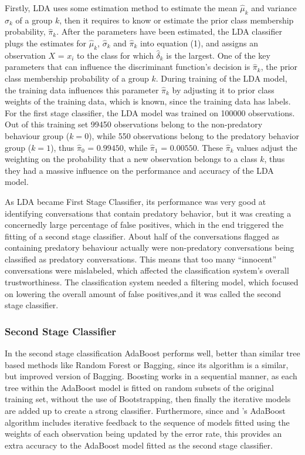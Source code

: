 \documentclass[11pt]{article}
\begin{document}
Firstly, LDA uses some estimation method to estimate the mean $\hat{\mu }_{k}$ and variance $\hat{\sigma}_{k}$ of a group $k$, then it requires to know or estimate the prior class membership probability, $\hat{\pi}_{k}$. After the parameters have been estimated, the LDA classifier plugs the estimates for $\hat{\mu }_{k}$, $\hat{\sigma}_{k}$ and $\hat{\pi}_{k}$ into equation (1), and assigns an observation $X$ = $x_i$ to the class for which $\hat{\delta}_{k}$ is the largest. One of the key parameters that can influence the discriminant function's decision is $\hat{\pi}_{k}$, the prior class membership probability of a group $k$. During training of the LDA model, the training data influences this parameter $\hat{\pi}_{k}$ by adjusting it to prior class weights of the training data, which is known, since the training data has labels. For the first stage classifier, the LDA model was trained on 100000 observations. Out of this training set 99450 observations belong to the non-predatory behaviour group ($k=0$), while 550 observations belong to the predatory behavior group ($k=1$), thus $\hat{\pi}_{0}$ = $0.99450$, while $\hat{\pi}_{1}$ = $0.00550$. These $\hat{\pi}_{k}$ values adjust the weighting on the probability that a new observation belongs to a class $k$, thus they had a massive influence on the performance and accuracy of the LDA model.

As LDA became First Stage Classifier, its performance was very good at identifying conversations that contain predatory behavior, but it was creating a concernedly large percentage of false positives, which in the end triggered the fitting of a second stage classifier. About half of the conversations flagged as containing predatory behaviour actually were non-predatory conversations being classified as predatory conversations. This means that too many ``innocent” conversations were mislabeled, which affected the classification system's overall trustworthiness. The classification system needed a filtering model, which focused on lowering the overall amount of false positives,and it was called the second stage classifier.

\subsubsection{Second Stage Classifier}
In the second stage classification AdaBoost performs well, better than similar tree based methods like Random Forest or Bagging, since its algorithm is a similar, but improved version of Bagging. Boosting works in a sequential manner, as each tree within the AdaBoost model is fitted on random subsets of the original training set, without the use of Bootstrapping, then finally the iterative models are added up to create a strong classifier. Furthermore, since \cite{freund1996experiments} and \cite{hastie2009multi}'s AdaBoost algorithm includes iterative feedback to the sequence of models fitted using the weights of each observation being updated by the error rate, this provides an extra accuracy to the AdaBoost model fitted as the second stage classifier.
\end{document}
